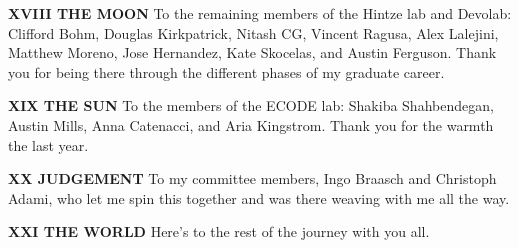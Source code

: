 \textbf{XVIII THE MOON} To the remaining members of the Hintze lab and Devolab: Clifford Bohm, Douglas Kirkpatrick, Nitash CG, Vincent Ragusa, Alex Lalejini, Matthew Moreno, Jose Hernandez, Kate Skocelas, and Austin Ferguson. Thank you for being there through the different phases of my graduate career.

\textbf{XIX THE SUN} To the members of the ECODE lab: Shakiba Shahbendegan, Austin Mills, Anna Catenacci, and Aria Kingstrom. Thank you for the warmth the last year.

\textbf{XX JUDGEMENT} To my committee members, Ingo Braasch and Christoph Adami, who let me spin this together and was there weaving with me all the way.

\textbf{XXI THE WORLD} Here's to the rest of the journey with you all.